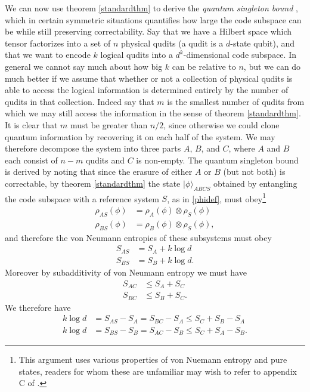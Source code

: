 \documentclass[toc]{PoS}
\newcommand{\ran}{\rangle}
\begin{document}
We can now use theorem \ref{standardthm} to derive the \textit{quantum singleton bound} \cite{Knill:1996ny}, which in certain symmetric situations quantifies how large the code subspace can be while still preserving correctability.  Say that we have a Hilbert space which tensor factorizes into a set of $n$ physical qudits (a qudit is a $d$-state qubit), and that we want to encode $k$ logical qudits into a $d^k$-dimensional code subspace.  In general we cannot say much about how big $k$ can be relative to $n$, but we can do much better if we assume that whether or not a collection of physical qudits is able to access the logical information is determined entirely by the number of qudits in that collection.  Indeed say that $m$ is the smallest number of qudits from which we may still access the information in the sense of theorem \ref{standardthm}.  It is clear that $m$ must be greater than $n/2$, since otherwise we could clone quantum information by recovering it on each half of the system.  We may therefore decompose the system into three parts $A$, $B$, and $C$, where $A$ and $B$ each consist of $n-m$ qudits and $C$ is non-empty.  The quantum singleton bound is derived by noting that since the erasure of either $A$ or $B$ (but not both) is correctable, by theorem \ref{standardthm} the state $|\phi\ran_{ABCS}$ obtained by entangling the code subspace with a reference system $S$, as in \eqref{phidef}, must obey\footnote{This argument uses various properties of von Nuemann entropy and pure states, readers for whom these are unfamiliar may wish to refer to appendix C of \cite{Harlow:2014yka}.}
\begin{align}\nonumber
\rho_{AS}(\phi)&=\rho_A(\phi)\otimes \rho_S(\phi)\\
\rho_{BS}(\phi)&=\rho_B(\phi)\otimes \rho_S(\phi),
\end{align}
and therefore the von Neumann entropies of these subsystems must obey
\begin{align}\nonumber
S_{AS}&=S_A+k\log d\\
S_{BS}&=S_B+k\log d.
\end{align}
Moreover by subadditivity of von Neumann entropy we must have
\begin{align}\nonumber
S_{AC}&\leq S_A+S_C\\
S_{BC}&\leq S_B+S_C.
\end{align}
We therefore have
\begin{align}\nonumber
k\log d&=S_{AS}-S_A=S_{BC}-S_A\leq S_C+S_B-S_A\\
k\log d&=S_{BS}-S_B=S_{AC}-S_B\leq S_C+S_A-S_B.
\end{align}
\end{document}
